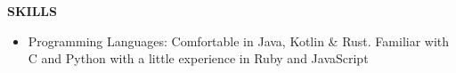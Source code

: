 \documentclass[10pt, a4paper]{article}
\begin{document}

\textbf{SKILLS}
\smallskip 
\begin{itemize}
\item Programming Languages: Comfortable in Java, Kotlin \& Rust. Familiar with C and Python with a little experience in Ruby and JavaScript
\end{itemize} 

\end{document}
